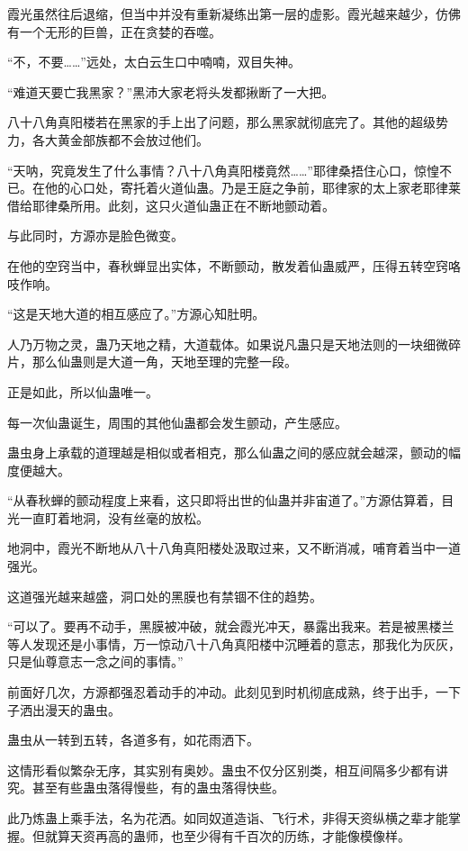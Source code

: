 \begin{this_body}
霞光虽然往后退缩，但当中并没有重新凝练出第一层的虚影。霞光越来越少，仿佛有一个无形的巨兽，正在贪婪的吞噬。

“不，不要……”远处，太白云生口中喃喃，双目失神。

“难道天要亡我黑家？”黑沛大家老将头发都揪断了一大把。

八十八角真阳楼若在黑家的手上出了问题，那么黑家就彻底完了。其他的超级势力，各大黄金部族都不会放过他们。

“天呐，究竟发生了什么事情？八十八角真阳楼竟然……”耶律桑捂住心口，惊惶不已。在他的心口处，寄托着火道仙蛊。乃是王庭之争前，耶律家的太上家老耶律莱借给耶律桑所用。此刻，这只火道仙蛊正在不断地颤动着。

与此同时，方源亦是脸色微变。

在他的空窍当中，春秋蝉显出实体，不断颤动，散发着仙蛊威严，压得五转空窍咯吱作响。

“这是天地大道的相互感应了。”方源心知肚明。

人乃万物之灵，蛊乃天地之精，大道载体。如果说凡蛊只是天地法则的一块细微碎片，那么仙蛊则是大道一角，天地至理的完整一段。

正是如此，所以仙蛊唯一。

每一次仙蛊诞生，周围的其他仙蛊都会发生颤动，产生感应。

蛊虫身上承载的道理越是相似或者相克，那么仙蛊之间的感应就会越深，颤动的幅度便越大。

“从春秋蝉的颤动程度上来看，这只即将出世的仙蛊并非宙道了。”方源估算着，目光一直盯着地洞，没有丝毫的放松。

地洞中，霞光不断地从八十八角真阳楼处汲取过来，又不断消减，哺育着当中一道强光。

这道强光越来越盛，洞口处的黑膜也有禁锢不住的趋势。

“可以了。要再不动手，黑膜被冲破，就会霞光冲天，暴露出我来。若是被黑楼兰等人发现还是小事情，万一惊动八十八角真阳楼中沉睡着的意志，那我化为灰灰，只是仙尊意志一念之间的事情。”

前面好几次，方源都强忍着动手的冲动。此刻见到时机彻底成熟，终于出手，一下子洒出漫天的蛊虫。

蛊虫从一转到五转，各道多有，如花雨洒下。

这情形看似繁杂无序，其实别有奥妙。蛊虫不仅分区别类，相互间隔多少都有讲究。甚至有些蛊虫落得慢些，有的蛊虫落得快些。

此乃炼蛊上乘手法，名为花洒。如同奴道造诣、飞行术，非得天资纵横之辈才能掌握。但就算天资再高的蛊师，也至少得有千百次的历练，才能像模像样。


\end{this_body}
